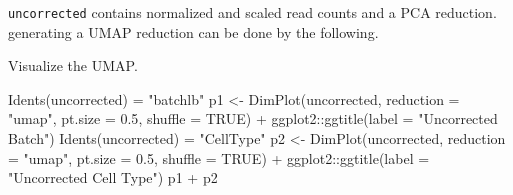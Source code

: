 \documentclass[
]{book}
\newenvironment{Shaded}{\begin{snugshade}}{\end{snugshade}}
\newcommand{\AttributeTok}[1]{\textcolor[rgb]{0.77,0.63,0.00}{#1}}
\newcommand{\ConstantTok}[1]{\textcolor[rgb]{0.00,0.00,0.00}{#1}}
\newcommand{\DecValTok}[1]{\textcolor[rgb]{0.00,0.00,0.81}{#1}}
\newcommand{\FloatTok}[1]{\textcolor[rgb]{0.00,0.00,0.81}{#1}}
\newcommand{\FunctionTok}[1]{\textcolor[rgb]{0.00,0.00,0.00}{#1}}
\newcommand{\NormalTok}[1]{#1}
\newcommand{\OtherTok}[1]{\textcolor[rgb]{0.56,0.35,0.01}{#1}}
\newcommand{\SpecialCharTok}[1]{\textcolor[rgb]{0.00,0.00,0.00}{#1}}
\newcommand{\StringTok}[1]{\textcolor[rgb]{0.31,0.60,0.02}{#1}}
\begin{document}
\texttt{uncorrected} contains normalized and scaled read counts and a PCA reduction. generating a UMAP reduction can be done by the following.

\begin{Shaded}
\end{Shaded}

Visualize the UMAP.

\begin{Shaded}
\begin{Highlighting}[]
\FunctionTok{Idents}\NormalTok{(uncorrected) }\OtherTok{=} \StringTok{"batchlb"}
\NormalTok{p1 }\OtherTok{\textless{}{-}} \FunctionTok{DimPlot}\NormalTok{(uncorrected, }\AttributeTok{reduction =} \StringTok{"umap"}\NormalTok{, }\AttributeTok{pt.size =} \FloatTok{0.5}\NormalTok{, }\AttributeTok{shuffle =} \ConstantTok{TRUE}\NormalTok{) }\SpecialCharTok{+}\NormalTok{ ggplot2}\SpecialCharTok{::}\FunctionTok{ggtitle}\NormalTok{(}\AttributeTok{label =} \StringTok{"Uncorrected Batch"}\NormalTok{)}
\FunctionTok{Idents}\NormalTok{(uncorrected) }\OtherTok{=} \StringTok{"CellType"}
\NormalTok{p2 }\OtherTok{\textless{}{-}} \FunctionTok{DimPlot}\NormalTok{(uncorrected, }\AttributeTok{reduction =} \StringTok{"umap"}\NormalTok{, }\AttributeTok{pt.size =} \FloatTok{0.5}\NormalTok{, }\AttributeTok{shuffle =} \ConstantTok{TRUE}\NormalTok{) }\SpecialCharTok{+}\NormalTok{ ggplot2}\SpecialCharTok{::}\FunctionTok{ggtitle}\NormalTok{(}\AttributeTok{label =} \StringTok{"Uncorrected Cell Type"}\NormalTok{)}
\NormalTok{p1 }\SpecialCharTok{+}\NormalTok{ p2}
\end{Highlighting}
\end{Shaded}
\end{document}

